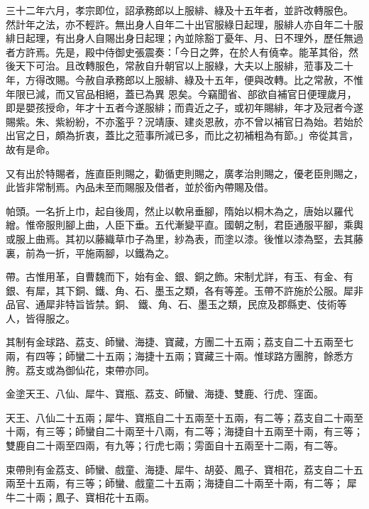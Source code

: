 \begin{pinyinscope}
 三十二年六月，孝宗即位，詔承務郎以上服緋、綠及十五年者，並許改轉服色。
 然計年之法，亦不輕許。無出身人自年二十出官服綠日起理，服緋人亦自年二十服緋日起理，有出身人自賜出身日起理；內並除豁丁憂年、月、日不理外，歷任無過者方許焉。先是，殿中侍御史張震奏：「今日之弊，在於人有僥幸。能革其俗，然後天下可治。且改轉服色，常赦自升朝官以上服綠，大夫以上服緋，蒞事及二十年，方得改賜。今赦自承務郎以上服緋、綠及十五年，便與改轉。比之常赦，不惟年限已減，而又官品相絕，蓋已為異
 恩矣。今竊聞省、部欲自補官日便理歲月，即是嬰孩授命，年才十五者今遂服緋；而貴近之子，或初年賜緋，年才及冠者今遂賜紫。朱、紫紛紛，不亦濫乎？況靖康、建炎恩赦，亦不曾以補官日為始。若始於出官之日，頗為折衷，蓋比之蒞事所減已多，而比之初補粗為有節。」帝從其言，故有是命。



 又有出於特賜者，旌直臣則賜之，勸循吏則賜之，廣孝治則賜之，優老臣則賜之，此皆非常制焉。內品未至而賜服及借者，並於銜內帶賜及借。



 帕頭。一名折上巾，起自後周，然止以軟帛垂腳，隋始以桐木為之，唐始以羅代繒。惟帝服則腳上曲，人臣下垂。五代漸變平直。國朝之制，君臣通服平腳，乘輿或服上曲焉。其初以藤織草巾子為里，紗為表，而塗以漆。後惟以漆為堅，去其藤裏，前為一折，平施兩腳，以鐵為之。



 帶。古惟用革，自曹魏而下，始有金、銀、銅之飾。宋制尤詳，有玉、有金、有銀、有犀，其下銅、鐵、角、石、墨玉之類，各有等差。玉帶不許施於公服。犀非品官、通犀非特旨皆禁。銅、
 鐵、角、石、墨玉之類，民庶及郡縣吏、伎術等人，皆得服之。



 其制有金球路、荔支、師蠻、海捷、寶藏，方團二十五兩；荔支自二十五兩至七兩，有四等；師蠻二十五兩；海捷十五兩；寶藏三十兩。惟球路方團胯，餘悉方胯。荔支或為御仙花，束帶亦同。



 金塗天王、八仙、犀牛、寶瓶、荔支、師蠻、海捷、雙鹿、行虎、窪面。



 天王、八仙二十五兩；犀牛、寶瓶自二十五兩至十五兩，有二等；荔支自二十兩至十兩，有三等；師蠻自二十兩至十八兩，有二等；海捷自十五兩至十兩，有三等；雙鹿自二十兩至四兩，有九等；行虎七兩；雱面自十五兩至十二兩，有二等。



 束帶則有金荔支、師蠻、戲童、海捷、犀牛、胡荽、鳳子、寶相花，荔支自二十五兩至十五兩，有三等；師蠻、戲童二十五兩；海捷自二十兩至十兩，有二等；
 犀牛二十兩；鳳子、寶相花十五兩。




\end{pinyinscope}
